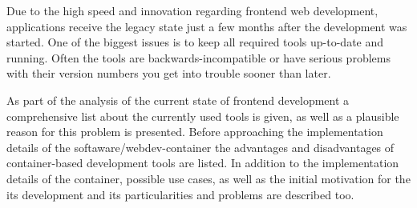 Due to the high speed and innovation regarding frontend web development, applications receive the legacy state just a few months after the development was started.
One of the biggest issues is to keep all required tools up-to-date and running.
Often the tools are backwards-incompatible or have serious problems with their version numbers you get into trouble sooner than later.

As part of the analysis of the current state of frontend development a comprehensive list about the currently used tools is given, as well as a plausible reason for this problem is presented.
Before approaching the implementation details of the softaware/webdev-container the advantages and disadvantages of container-based development tools are listed.
In addition to the implementation details of the container, possible use cases, as well as the initial motivation for the its development and its particularities and problems are described too.
